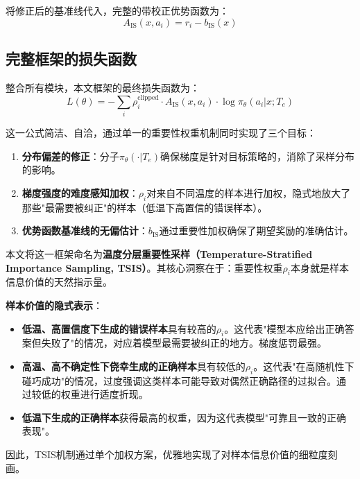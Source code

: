 将修正后的基准线代入，完整的带校正优势函数为：
\begin{equation}
A_{\text{IS}}(x, a_i) = r_i - b_{\text{IS}}(x)
\label{eq:corrected_advantage}
\end{equation}

\subsection{完整框架的损失函数}
\label{subsec:complete_loss_function}

整合所有模块，本文框架的最终损失函数为：
\begin{equation}
L(\theta) = - \sum_i \rho_i^{\text{clipped}} \cdot A_{\text{IS}}(x, a_i) \cdot \log \pi_\theta(a_i | x; T_e)
\label{eq:final_loss}
\end{equation}

这一公式简洁、自洽，通过单一的重要性权重机制同时实现了三个目标：
\begin{enumerate}
    \item \textbf{分布偏差的修正}：分子$\pi_\theta(\cdot|T_e)$确保梯度是针对目标策略的，消除了采样分布的影响。
    \item \textbf{梯度强度的难度感知加权}：$\rho_i$对来自不同温度的样本进行加权，隐式地放大了那些"最需要被纠正"的样本（低温下高置信的错误样本）。
    \item \textbf{优势函数基准线的无偏估计}：$b_{\text{IS}}$通过重要性加权确保了期望奖励的准确估计。
\end{enumerate}

本文将这一框架命名为\textbf{温度分层重要性采样（Temperature-Stratified Importance Sampling, TSIS）}。其核心洞察在于：重要性权重$\rho_i$本身就是样本信息价值的天然指示量。

\textbf{样本价值的隐式表示}：
\begin{itemize}
    \item \textbf{低温、高置信度下生成的错误样本}具有较高的$\rho_i$。这代表"模型本应给出正确答案但失败了"的情况，对应着模型最需要被纠正的地方。梯度惩罚最强。
    \item \textbf{高温、高不确定性下侥幸生成的正确样本}具有较低的$\rho_i$。这代表"在高随机性下碰巧成功"的情况，过度强调这类样本可能导致对偶然正确路径的过拟合。通过较低的权重进行适度折现。
    \item \textbf{低温下生成的正确样本}获得最高的权重，因为这代表模型"可靠且一致的正确表现"。
\end{itemize}

因此，TSIS机制通过单个加权方案，优雅地实现了对样本信息价值的细粒度刻画。

